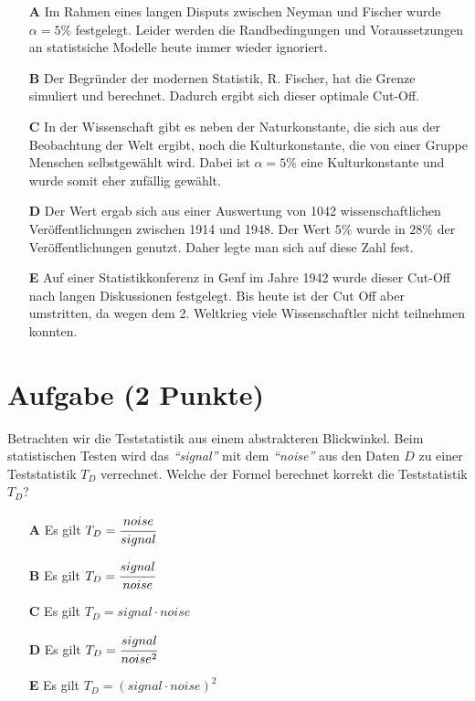 \documentclass[a4paper, 9pt]{scrartcl}\usepackage[]{graphicx}\usepackage[]{xcolor}
\begin{document}
\begin{enumerate}
\item [\textbf{A} \msquare] Im Rahmen eines langen Disputs zwischen Neyman und Fischer wurde $\alpha = 5\%$ festgelegt. Leider werden die Randbedingungen und Voraussetzungen an statistsiche Modelle heute immer wieder ignoriert.
\item [\textbf{B} \msquare] Der Begründer der modernen Statistik, R. Fischer, hat die Grenze simuliert und berechnet. Dadurch ergibt sich dieser optimale Cut-Off.
\item [\textbf{C} \msquare] In der Wissenschaft gibt es neben der Naturkonstante, die sich aus der Beobachtung der Welt ergibt, noch die Kulturkonstante, die von einer Gruppe Menschen selbstgewählt wird. Dabei ist $\alpha = 5\%$ eine Kulturkonstante und wurde somit eher zufällig gewählt.
\item [\textbf{D} \msquare] Der Wert ergab sich aus einer Auswertung von 1042 wissenschaftlichen Veröffentlichungen zwischen 1914 und 1948. Der Wert $5\%$ wurde in $28\%$ der Veröffentlichungen genutzt. Daher legte man sich auf diese Zahl fest.
\item [\textbf{E} \msquare] Auf einer Statistikkonferenz in Genf im Jahre 1942 wurde dieser Cut-Off nach langen Diskussionen festgelegt. Bis heute ist der Cut Off aber umstritten, da wegen dem 2. Weltkrieg viele Wissenschaftler nicht teilnehmen konnten.
\end{enumerate}

\section{Aufgabe \hfill (2 Punkte)}

Betrachten wir die Teststatistik aus einem abstrakteren Blickwinkel. Beim
statistischen Testen wird das \textit{"`signal"'} mit dem
\textit{"`noise"'} aus den Daten $D$ zu einer Teststatistik $T_D$ verrechnet. Welche der Formel
berechnet korrekt die Teststatistik $T_D$?



\begin{enumerate}
\item [\textbf{A} \msquare] Es gilt $T_D = \cfrac{noise}{signal}$
\item [\textbf{B} \msquare] Es gilt $T_D = \cfrac{signal}{noise}$
\item [\textbf{C} \msquare] Es gilt $T_D = signal \cdot noise$
\item [\textbf{D} \msquare] Es gilt $T_D = \cfrac{signal}{noise^2}$
\item [\textbf{E} \msquare] Es gilt $T_D = (signal \cdot noise)^2$
\end{enumerate}
\end{document}
